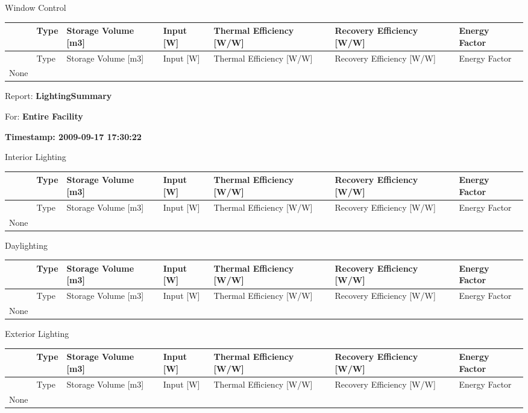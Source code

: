 Window Control

\begin{longtable}[c]{p{0.85in}p{0.85in}p{0.85in}p{0.85in}p{0.85in}p{0.85in}p{0.85in}}
\toprule 
~ & Type & Storage Volume [m3] & Input [W] & Thermal Efficiency [W/W] & Recovery Efficiency [W/W] & Energy Factor \tabularnewline
\midrule
\endfirsthead

\toprule 
~ & Type & Storage Volume [m3] & Input [W] & Thermal Efficiency [W/W] & Recovery Efficiency [W/W] & Energy Factor \tabularnewline
\midrule
\endhead

None & ~ & ~ & ~ & ~ & ~ & ~ \tabularnewline
\bottomrule
\end{longtable}

Report: \textbf{LightingSummary}

For: \textbf{Entire Facility}

\textbf{Timestamp: 2009-09-17 17:30:22}

Interior Lighting

\begin{longtable}[c]{p{0.85in}p{0.85in}p{0.85in}p{0.85in}p{0.85in}p{0.85in}p{0.85in}}
\toprule 
~ & Type & Storage Volume [m3] & Input [W] & Thermal Efficiency [W/W] & Recovery Efficiency [W/W] & Energy Factor \tabularnewline
\midrule
\endfirsthead

\toprule 
~ & Type & Storage Volume [m3] & Input [W] & Thermal Efficiency [W/W] & Recovery Efficiency [W/W] & Energy Factor \tabularnewline
\midrule
\endhead

None & ~ & ~ & ~ & ~ & ~ & ~ \tabularnewline
\bottomrule
\end{longtable}

Daylighting

\begin{longtable}[c]{p{0.85in}p{0.85in}p{0.85in}p{0.85in}p{0.85in}p{0.85in}p{0.85in}}
\toprule 
~ & Type & Storage Volume [m3] & Input [W] & Thermal Efficiency [W/W] & Recovery Efficiency [W/W] & Energy Factor \tabularnewline
\midrule
\endfirsthead

\toprule 
~ & Type & Storage Volume [m3] & Input [W] & Thermal Efficiency [W/W] & Recovery Efficiency [W/W] & Energy Factor \tabularnewline
\midrule
\endhead

None & ~ & ~ & ~ & ~ & ~ & ~ \tabularnewline
\bottomrule
\end{longtable}

Exterior Lighting

\begin{longtable}[c]{p{0.85in}p{0.85in}p{0.85in}p{0.85in}p{0.85in}p{0.85in}p{0.85in}}
\toprule 
~ & Type & Storage Volume [m3] & Input [W] & Thermal Efficiency [W/W] & Recovery Efficiency [W/W] & Energy Factor \tabularnewline
\midrule
\endfirsthead

\toprule 
~ & Type & Storage Volume [m3] & Input [W] & Thermal Efficiency [W/W] & Recovery Efficiency [W/W] & Energy Factor \tabularnewline
\midrule
\endhead

None & ~ & ~ & ~ & ~ & ~ & ~ \tabularnewline
\bottomrule
\end{longtable}

